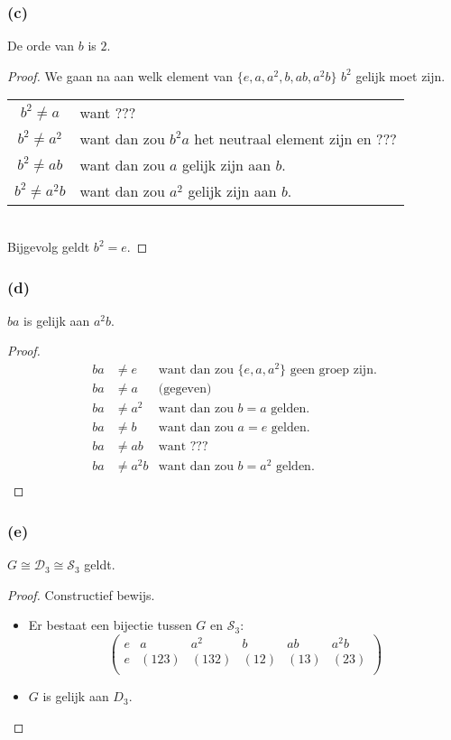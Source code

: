 \documentclass[main.tex]{subfiles}
\begin{document}
\subsubsection*{(c)}
De orde van $b$ is $2$.

\begin{proof}
  We gaan na aan welk element van $\{ e,a,a^{2},b,ab,a^{2}b \}$ $b^{2}$ gelijk moet zijn.\\
  \begin{tabular}[H]{cl}
    \centering
    $b^{2} \neq  a$ & want ???\\
    $b^{2} \neq  a^{2}$ & want dan zou $b^{2}a$ het neutraal element zijn en ???\\
    $b^{2} \neq  ab$ & want dan zou $a$ gelijk zijn aan $b$.\\
    $b^{2} \neq  a^{2}b$ & want dan zou $a^{2}$ gelijk zijn aan $b$.\\
  \end{tabular}\\
  Bijgevolg geldt $b^{2} = e$.
\end{proof}


\subsubsection*{(d)}
$ba$ is gelijk aan $a^{2}b$.

\begin{proof}
  \[
  \begin{array}{rll}
    ba &\neq e &\text{want dan zou } \{ e,a,a^{2} \} \text{ geen groep zijn.}\\ 
    ba &\neq a &\text{(gegeven)}\\ 
    ba &\neq a^{2} &\text{want dan zou } b=a \text{ gelden.} \\ 
    ba &\neq b &\text{want dan zou } a=e \text{ gelden.} \\ 
    ba &\neq ab &\text{want ???} \\ 
    ba &\neq a^{2}b &\text{want dan zou } b=a^{2} \text{ gelden.} \\ 
  \end{array}
  \]
\end{proof}

\subsubsection*{(e)}
$G \cong \mathcal{D}_{3} \cong \mathcal{S}_{3}$ geldt.

\begin{proof}
  Constructief bewijs.
  \begin{itemize}
  \item Er bestaat een bijectie tussen $G$ en $\mathcal{S}_{3}$:
    \[
    \begin{pmatrix}
      e & a     & a^{2} & b    & ab   & a^{2}b\\
      e & (123) & (132) & (12) & (13) & (23)\\
    \end{pmatrix}
    \]
  \item $G$ is gelijk aan $D_{3}$.
  \end{itemize}
\end{proof}
\end{document}
